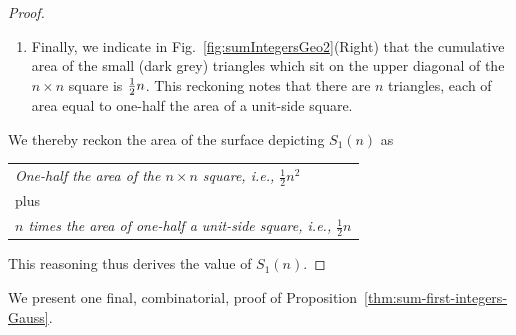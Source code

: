 \begin{proof}
\begin{enumerate}
\item
Finally, we indicate in Fig.~\ref{fig:sumIntegersGeo2}(Right) that the cumulative area of the small (dark grey) triangles which sit on the upper diagonal of the $n \times n$ square is ${1 \over 2} n$.  This reckoning notes that there are $n$ triangles, each of area equal to one-half the area of a unit-side square.
\end{enumerate}
We thereby reckon the area of the surface depicting $S_1(n)$ as

\begin{tabular}{l}
{\it One-half the area of the $n \times n$ square,
i.e., $\frac{1}{2} n^2$} \\
\hspace*{.15in} plus   \\
{\it $n$ times the area of one-half a unit-side square,
i.e., $\frac{1}{2} n$}
\end{tabular}

\smallskip

\noindent
This reasoning thus derives the value of $S_1(n)$.
\end{proof}

\medskip

We present one final, combinatorial, proof of Proposition~\ref{thm:sum-first-integers-Gauss}.

